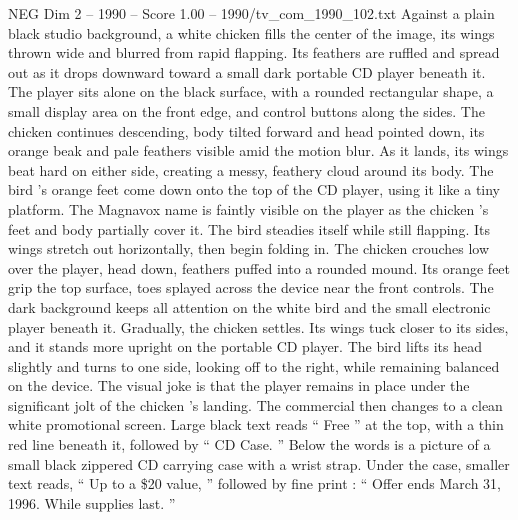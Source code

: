 \begin{textsample}{NEG Dim 2 – 1990 – Score 1.00 – 1990/tv\_com\_1990\_102.txt}  \label{ex:f2_neg_069}
Against a plain black studio background, a white chicken fills the center of the image, its wings thrown wide and blurred from rapid flapping.
Its feathers are ruffled and spread out as it drops downward toward a small dark portable CD player beneath it.
The player sits alone on the black surface, with a rounded rectangular shape, a small display area on the front edge, and control buttons along the sides.
The chicken continues descending, body tilted forward and head pointed down, its orange beak and pale feathers visible amid the motion blur.
As it lands, its wings beat hard on either side, creating a messy, feathery cloud around its body.
The bird ’s orange feet come down onto the top of the CD player, using it like a tiny platform.
The Magnavox name is faintly visible on the player as the chicken ’s feet and body partially cover it.
The bird steadies itself while still flapping.
Its wings stretch out horizontally, then begin folding in.
The chicken crouches low over the player, head down, feathers puffed into a rounded mound.
Its orange feet grip the top surface, toes splayed across the device near the front controls.
The dark background keeps all attention on the white bird and the small electronic player beneath it.
Gradually, the chicken settles.
Its wings tuck closer to its sides, and it stands more upright on the portable CD player.
The bird lifts its head slightly and turns to one side, looking off to the right, while remaining balanced on the device.
The visual joke is that the player remains in place under the significant jolt of the chicken ’s landing.
The commercial then changes to a clean white promotional screen.
Large black text reads “ Free ” at the top, with a thin red line beneath it, followed by “ CD Case. ” Below the words is a picture of a small black zippered CD carrying case with a wrist strap.
Under the case, smaller text reads, “ Up to a \$20 value, ” followed by fine print : “ Offer ends March 31, 1996.
While supplies last. ”

\end{textsample}
